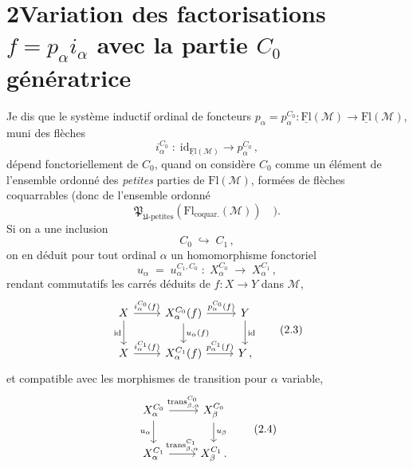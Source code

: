 \documentclass[11pt]{article}
\newcommand{\printedpage}[1]{\marginpar{\footnotesize p.~#1}}
\newcommand{\msp}[1]{\marginpar{\footnotesize [#1]}}
\newcommand{\Fl}{\mathrm{Fl}}
\newcommand{\uFl}{\underline{\mathrm{Fl}}}
\newcommand{\cM}{\mathcal{M}}
\begin{document}
\printedpage{10}

\section*{2\quad Variation des factorisations $f=p_\alpha i_\alpha$ avec la partie $C_0$ génératrice}

Je dis que le système inductif ordinal de foncteurs $p_\alpha=p_\alpha^{C_0} : \uFl(\cM)\longrightarrow\uFl(\cM)$,
\msp{page 13}
muni des flèches
\[
i_\alpha^{C_0} \;:\; \mathrm{id}_{\uFl(\cM)} \longrightarrow p_\alpha^{C_0}\,,
\]
dépend fonctoriellement de $C_0$, quand on considère $C_0$ comme un élément de l'ensemble ordonné des \textit{petites} parties de $\Fl(\cM)$, formées de flèches coquarrables (donc de l'ensemble ordonné
\[
\mathfrak{P}_{\mathfrak{U}\text{-petites}}(\Fl_{\text{coquar.}}(\cM)) \quad ).
\]
Si on a une inclusion
\[
C_0 \;\hookrightarrow\; C_1\,,
\tag*{(2.1)}
\]
on en déduit pour tout ordinal $\alpha$ un homomorphisme fonctoriel
\[
u_\alpha \;=\; u_\alpha^{C_1,C_0} \;:\; X_\alpha^{C_0} \;\longrightarrow\; X_\alpha^{C_1}\,,
\tag*{(2.2)}
\]
rendant commutatifs les carrés déduits de $f : X\longrightarrow Y$ dans $\cM$,
\[
\begin{tikzcd}
X \arrow[r, "i_\alpha^{C_0}(f)"] \arrow[d, "\mathrm{id}"'] & X_\alpha^{C_0}(f) \arrow[r, "p_\alpha^{C_0}(f)"] \arrow[d, "u_\alpha(f)"] & Y \arrow[d, "\mathrm{id}"] \\
X \arrow[r, "i_\alpha^{C_1}(f)"] & X_\alpha^{C_1}(f) \arrow[r, "p_\alpha^{C_1}(f)"] & Y\,,
\end{tikzcd}
\tag*{(2.3)}
\]
et compatible avec les morphismes de transition pour $\alpha$ variable,
\[
\begin{tikzcd}
X_\alpha^{C_0} \arrow[r, "{\mathrm{trans}_{\beta,\alpha}^{C_0}}"] \arrow[d, "u_\alpha"'] & X_\beta^{C_0} \arrow[d, "u_\beta"] \\
X_\alpha^{C_1} \arrow[r, "{\mathrm{trans}_{\beta,\alpha}^{C_1}}"] & X_\beta^{C_1}\,.
\end{tikzcd}
\tag*{(2.4)}
\]

\msp{page 14}
\end{document}
